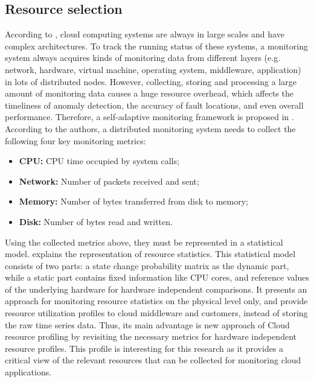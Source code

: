 \subsection{Resource selection} \label{sec:resource_selection}
According to \cite{wang2018self}, cloud computing systems are always in large scales and have complex architectures. To track the running status of these systems, a monitoring system always acquires kinds of monitoring data from different layers (e.g. network, hardware, virtual machine, operating system, middleware, application) in lots of distributed nodes. However, collecting, storing and processing a large amount of monitoring data causes a huge resource overhead, which affects the timeliness of anomaly detection, the accuracy of fault locations, and even overall performance. Therefore, a self-adaptive monitoring framework is proposed in \cite{wang2018self}. According to the authors, a distributed monitoring system needs to collect the following four key monitoring metrics:
\begin{itemize}
    \item \textbf{CPU: }CPU time occupied by system calls;
    \item \textbf{Network: }Number of packets received and sent;
    \item \textbf{Memory: }Number of bytes transferred from disk to memory;
    \item \textbf{Disk: }Number of bytes read and written.
\end{itemize}

\noindent
Using the collected metrics above, they must be represented in a statistical model. \cite{hauser2018reviewing} explains the representation of resource statistics. This statistical model consists of two parts: a state change probability matrix as the dynamic part, while a static part contains fixed information like CPU cores, and reference values of the underlying hardware for hardware independent comparisons. It presents an approach for monitoring resource statistics on the physical level only, and provide resource utilization profiles to cloud middleware and customers, instead of storing the raw time series data. Thus, its main advantage is new approach of Cloud resource profiling by revisiting the necessary metrics for hardware independent resource profiles. This profile is interesting for this research as it provides a critical view of the relevant resources that can be collected for monitoring cloud applications.\\


